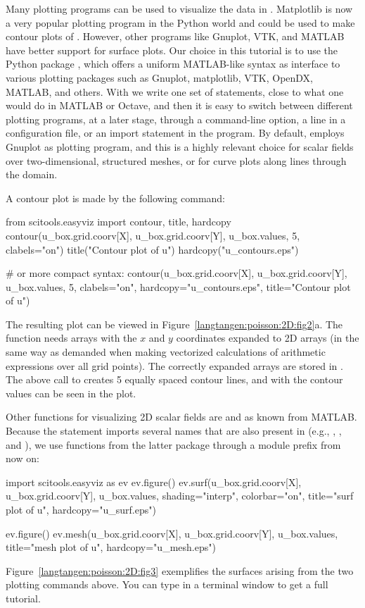 Many plotting programs can be used to visualize the data in
. Matplotlib is now a very popular
plotting program in the Python world and could be used to make contour
plots of . However, other programs
like Gnuplot, VTK, and MATLAB have better support for surface
plots. Our choice in this tutorial is to use the Python package
, which offers a
uniform MATLAB-like syntax as interface to various plotting packages
such as Gnuplot, matplotlib, VTK, OpenDX, MATLAB, and others. With
 we write one set of
statements, close to what one would do in MATLAB or Octave, and then
it is easy to switch between different plotting programs, at a later
stage, through a command-line option, a line in a configuration file,
or an import statement in the program.  By default,
 employs Gnuplot as
plotting program, and this is a highly relevant choice for scalar
fields over two-dimensional, structured meshes, or for curve plots
along lines through the domain.

A contour plot is made by the following  command:
\begin{python}
from scitools.easyviz import contour, title, hardcopy
contour(u_box.grid.coorv[X], u_box.grid.coorv[Y], u_box.values,
        5, clabels="on")
title("Contour plot of u")
hardcopy("u_contours.eps")

# or more compact syntax:
contour(u_box.grid.coorv[X], u_box.grid.coorv[Y], u_box.values,
        5, clabels="on",
        hardcopy="u_contours.eps", title="Contour plot of u")
\end{python}
The resulting plot can be viewed in
Figure~\ref{langtangen:poisson:2D:fig2}a.  The
 function needs arrays with the
$x$ and $y$ coordinates expanded to 2D arrays (in the same way as
demanded when making vectorized 
calculations of arithmetic expressions over all grid points).  The
correctly expanded arrays are stored in
.  The above call to
 creates 5 equally spaced
contour lines, and with 
the contour values can be seen in the plot.

Other functions for visualizing 2D scalar fields are  and
 as known from MATLAB. Because the  statement imports several names that are also present in
 (e.g., , , and
), we use functions from the latter package through a
module prefix  from now on:
\begin{python}
import scitools.easyviz as ev
ev.figure()
ev.surf(u_box.grid.coorv[X], u_box.grid.coorv[Y], u_box.values,
        shading="interp", colorbar="on",
        title="surf plot of u", hardcopy="u_surf.eps")

ev.figure()
ev.mesh(u_box.grid.coorv[X], u_box.grid.coorv[Y], u_box.values,
        title="mesh plot of u", hardcopy="u_mesh.eps")
\end{python}
Figure~\ref{langtangen:poisson:2D:fig3} exemplifies the surfaces
arising from the two plotting commands above.  You can type
 in a terminal
window to get a full tutorial.


